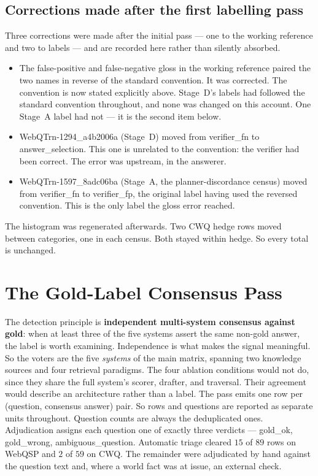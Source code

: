 \subsection*{Corrections made after the first labelling pass}

Three corrections were made after the initial pass --- one to the working
reference and two to labels --- and are recorded here rather than silently
absorbed.

\begin{itemize}
\item The false-positive and false-negative gloss in the working reference
paired the two names in reverse of the standard convention. It was corrected.
The convention is now stated explicitly above. Stage~D's labels had followed
the standard convention throughout, and none was changed on this account. One
Stage~A label had not --- it is the second item below.
\item \textsf{WebQTrn-1294\_a4b2006a} (Stage~D) moved from \textsf{verifier\_fn}
to \textsf{answer\_selection}. This one is unrelated to the convention: the
verifier had been correct. The error was upstream, in the answerer.
\item \textsf{WebQTrn-1597\_8adc06ba} (Stage~A, the planner-discordance census)
moved from \textsf{verifier\_fn} to \textsf{verifier\_fp}, the original label
having used the reversed convention. This is the only label the gloss error
reached.
\end{itemize}

The histogram was regenerated afterwards. Two CWQ hedge rows moved between
categories, one in each census. Both stayed within \textsf{hedge}. So every
total is unchanged.


\section{The Gold-Label Consensus Pass}\label{app:goldpass}

The detection principle is \textbf{independent multi-system consensus against
gold}: when at least three of the five systems assert the same non-gold answer,
the label is worth examining. Independence is what makes the signal meaningful.
So the voters are the five \emph{systems} of the main matrix, spanning two
knowledge sources and four retrieval paradigms. The four ablation conditions
would not do, since they share the full system's scorer, drafter, and traversal.
Their agreement would describe an architecture rather than a label. The pass
emits one row per (question, consensus answer) pair. So rows and questions are
reported as separate units throughout. Question counts are always the
deduplicated ones. Adjudication assigns each question one of exactly three
verdicts --- \textsf{gold\_ok}, \textsf{gold\_wrong},
\textsf{ambiguous\_question}. Automatic triage cleared $15$ of $89$ rows on
WebQSP and $2$ of $59$ on CWQ. The remainder were adjudicated by hand against
the question text and, where a world fact was at issue, an external check.

